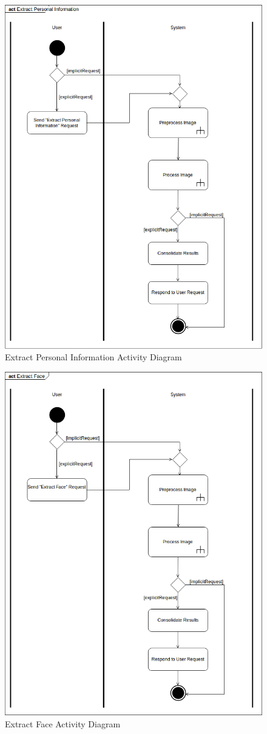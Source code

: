 \documentclass{article}
\begin{document}
	\begin{figure}[h]
		\centering
		\includegraphics[scale=0.5]{img/extract_personal_info_activity.png}
		\caption{Extract Personal Information Activity Diagram}
	\end{figure}
\pagebreak
	\begin{figure}[h]
		\centering
		\includegraphics[scale=0.5]{img/extract_face_activity.png}
		\caption{Extract Face Activity Diagram}
	\end{figure}
\pagebreak
\end{document}
